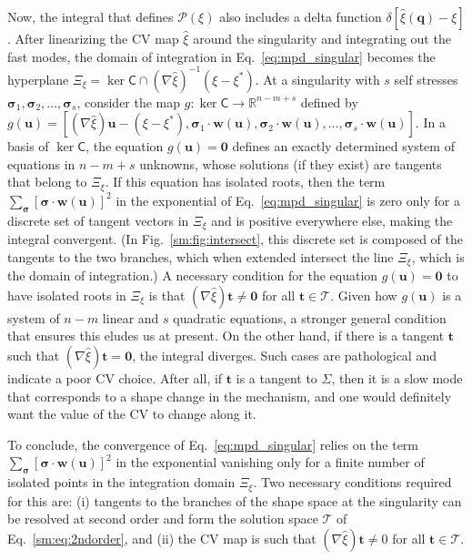 Now, the integral that defines $\mathscr{P}(\xi)$ also includes a delta function $\delta[\hat{\xi}(\bm{q}) - \xi]$.
After linearizing the CV map $\hat{\xi}$ around the singularity and integrating out the fast modes, the domain of integration in Eq.~\eqref{eq:mpd_singular} becomes the hyperplane $\Xi_{\xi} = \ker\mathsf{C} \cap (\nabla\hat{\xi})^{-1}(\xi - \xi^{*})$.
At a singularity with $s$ self stresses $\bm{\sigma}_{1}, \bm{\sigma}_{2}, \ldots, \bm{\sigma}_{s}$, consider the map $g: \ker\mathsf{C} \to \mathbb{R}^{n - m + s}$ defined by $g(\bm{u}) = [(\nabla\hat{\xi})\bm{u} - (\xi - \xi^{*}), \bm{\sigma}_{1}\cdot \bm{w}(\bm{u}), \bm{\sigma}_{2}\cdot \bm{w}(\bm{u}), \ldots, \bm{\sigma}_{s}\cdot \bm{w}(\bm{u})]$.
In a basis of $\ker\mathsf{C}$, the equation $g(\bm{u}) = \bm{0}$ defines an exactly determined system of equations in $n-m+s$ unknowns, whose solutions (if they exist) are tangents that belong to $\Xi_{\xi}$.
If this equation has isolated roots, then the term $\sum_{\bm{\sigma}} [\bm{\sigma}\cdot\bm{w}(\bm{u})]^{2}$ in the exponential of Eq.~\eqref{eq:mpd_singular} is zero only for a discrete set of tangent vectors in $\Xi_{\xi}$ and is positive everywhere else, making the integral convergent.
(In Fig.~\ref{sm:fig:intersect}, this discrete set is composed of the tangents to the two branches, which when extended intersect the line $\Xi_{\xi}$, which is the domain of integration.)
A necessary condition for the equation $g(\bm{u}) = \bm{0}$ to have isolated roots in $\Xi_{\xi}$ is that $(\nabla\hat{\xi})\bm{t} \neq \bm{0}$ for all $\bm{t} \in \mathscr{T}$.
Given how $g(\bm{u})$ is a system of $n - m$ linear and $s$ quadratic equations, a stronger general condition that ensures this eludes us at present.
On the other hand, if there is a tangent $\bm{t}$ such that $(\nabla\hat{\xi})\bm{t} = \bm{0}$, the integral diverges.
Such cases are pathological and indicate a poor CV choice.
After all, if $\bm{t}$ is a tangent to $\Sigma$, then it is a slow mode that corresponds to a shape change in the mechanism, and one would definitely want the value of the CV to change along it.

To conclude, the convergence of Eq.~\eqref{eq:mpd_singular} relies on the term $\sum_{\bm{\sigma}}[\bm{\sigma}\cdot\bm{w}(\bm{u})]^{2}$ in the exponential vanishing only for a finite number of isolated points in the integration domain $\Xi_{\xi}$.
Two necessary conditions required for this are: (i) tangents to the branches of the shape space at the singularity can be resolved at second order and form the solution space $\mathscr{T}$ of Eq.~\eqref{sm:eq:2ndorder}, and (ii) the CV map is such that $(\nabla\hat{\xi})\bm{t} \neq 0$ for all $\bm{t} \in \mathscr{T}$.

